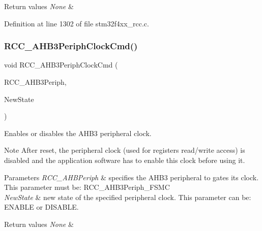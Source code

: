 \begin{DoxyRetVals}{Return values}
{\em None} & \\
\hline
\end{DoxyRetVals}


Definition at line 1302 of file stm32f4xx\+\_\+rcc.\+c.

\mbox{\label{group___r_c_c_ga4eb8c119f2e9bf2bd2e042d27f151338}} 
\subsubsection{\texorpdfstring{R\+C\+C\+\_\+\+A\+H\+B3\+Periph\+Clock\+Cmd()}{RCC\_AHB3PeriphClockCmd()}}
{\footnotesize\ttfamily void R\+C\+C\+\_\+\+A\+H\+B3\+Periph\+Clock\+Cmd (\begin{DoxyParamCaption}\item[{uint32\+\_\+t}]{R\+C\+C\+\_\+\+A\+H\+B3\+Periph,  }\item[{Functional\+State}]{New\+State }\end{DoxyParamCaption})}



Enables or disables the A\+H\+B3 peripheral clock. 

\begin{DoxyNote}{Note}
After reset, the peripheral clock (used for registers read/write access) is disabled and the application software has to enable this clock before using it. 
\end{DoxyNote}

\begin{DoxyParams}{Parameters}
{\em R\+C\+C\+\_\+\+A\+H\+B\+Periph} & specifies the A\+H\+B3 peripheral to gates its clock. This parameter must be\+: R\+C\+C\+\_\+\+A\+H\+B3\+Periph\+\_\+\+F\+S\+MC \\
\hline
{\em New\+State} & new state of the specified peripheral clock. This parameter can be\+: E\+N\+A\+B\+LE or D\+I\+S\+A\+B\+LE. \\
\hline
\end{DoxyParams}

\begin{DoxyRetVals}{Return values}
{\em None} & \\
\hline
\end{DoxyRetVals}


